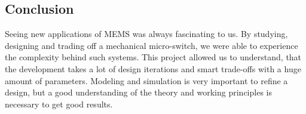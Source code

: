 \subsection{Conclusion}
\label{sec:conclusion}
Seeing new applications of MEMS was always fascinating to us.
By studying, designing and trading off a mechanical micro-switch, we were able to experience the complexity behind such systems.
This project allowed us to understand, that the development takes a lot of design iterations and smart trade-offs with a huge amount of parameters.
Modeling and simulation is very important to refine a design, but a good understanding of the theory and working principles is necessary to get good results.
